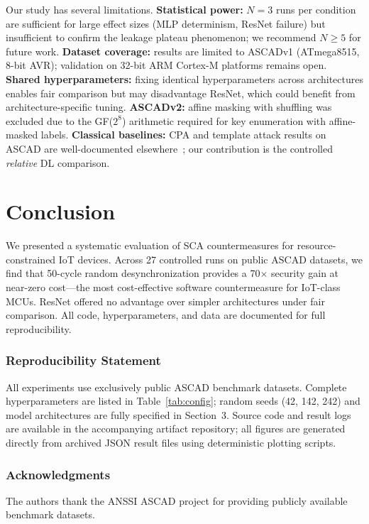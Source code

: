 \documentclass[runningheads]{llncs}
\begin{document}
Our study has several limitations. \textbf{Statistical power:} $N{=}3$ runs per condition are sufficient for large effect sizes (MLP determinism, ResNet failure) but insufficient to confirm the leakage plateau phenomenon; we recommend $N \geq 5$ for future work. \textbf{Dataset coverage:} results are limited to ASCADv1 (ATmega8515, 8-bit AVR); validation on 32-bit ARM Cortex-M platforms remains open. \textbf{Shared hyperparameters:} fixing identical hyperparameters across architectures enables fair comparison but may disadvantage ResNet, which could benefit from architecture-specific tuning. \textbf{ASCADv2:} affine masking with shuffling was excluded due to the GF($2^8$) arithmetic required for key enumeration with affine-masked labels. \textbf{Classical baselines:} CPA and template attack results on ASCAD are well-documented elsewhere~\cite{DBLP:journals/iacr/ProuffSRLB18}; our contribution is the controlled \emph{relative} DL comparison.

\section{Conclusion}

We presented a systematic evaluation of SCA countermeasures for resource-constrained IoT devices. Across 27 controlled runs on public ASCAD datasets, we find that 50-cycle random desynchronization provides a 70$\times$ security gain at near-zero cost---the most cost-effective software countermeasure for IoT-class MCUs. ResNet offered no advantage over simpler architectures under fair comparison. All code, hyperparameters, and data are documented for full reproducibility.

\subsubsection*{Reproducibility Statement}
All experiments use exclusively public ASCAD benchmark datasets. Complete hyperparameters are listed in Table~\ref{tab:config}; random seeds (42, 142, 242) and model architectures are fully specified in Section~3. Source code and result logs are available in the accompanying artifact repository; all figures are generated directly from archived JSON result files using deterministic plotting scripts.

\subsubsection*{Acknowledgments}
The authors thank the ANSSI ASCAD project for providing publicly available benchmark datasets.
\end{document}
